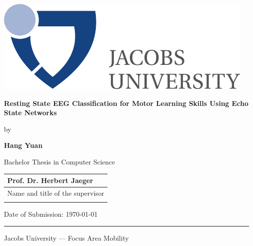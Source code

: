 \documentclass[a4paper,11pt,oneside]{article}
\newcommand{\myname}{Hang Yuan}
\newcommand{\mytitle}{Resting State EEG Classification for Motor Learning Skills Using Echo State Networks}
\newcommand{\mysupervisor}{Prof. Dr. Herbert Jaeger }
\begin{document}

  \thispagestyle{empty}

  \begin{flushright}
    \includegraphics[scale=0.7]{bsc-logo}
  \end{flushright}
  \vspace{20mm}
  \begin{center}
    \huge
    \textbf{\mytitle}
  \end{center}
  \vspace*{4mm}
  \begin{center}
   \Large by
  \end{center}
  \vspace*{4mm}
  \begin{center}
    \Large
    \textbf{\myname}
  \end{center}
  \vspace*{20mm}
  \begin{center}
    \large


    Bachelor Thesis in Computer Science
  \end{center}
  \vfill
  \begin{flushright}
    \large
    \begin{tabular}{l}
      \mysupervisor \\       \hline
      Name and title of the supervisor \\
      \\
    \end{tabular}
  \end{flushright}
  \vspace*{8mm}
  \begin{flushleft}
    \large
    Date of Submission: \today \\
    \rule{\textwidth}{1pt}
  \end{flushleft}
  \begin{center}
    \Large Jacobs University --- Focus Area Mobility
  \end{center}

  \newpage
  \thispagestyle{empty}
\end{document}
